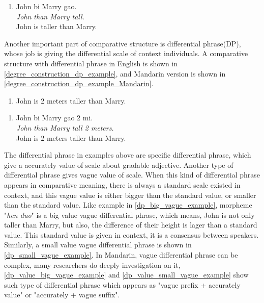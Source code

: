 \documentclass{ctexart}
\let \cite \parencite
\begin{document}
\begin{enumerate}[resume]
    \item \label{degree_construction_example_Mandarin}
    John bi Marry gao.  \\
    \textit{John than Marry tall.} \\
    John is taller than Marry.
\end{enumerate}

Another important part of comparative structure is differential phrase(DP), whose job is giving the differential scale of context individuals. A comparative structure with differential phrase in English is shown in \ref{degree_construction_dp_example}, and Mandarin version is shown in \ref{degree_construction_dp_example_Mandarin}.

\begin{enumerate}
    \item \label{degree_construction_dp_example}
    John is 2 meters taller than Marry.
\end{enumerate}

\begin{enumerate}[resume]
    \item \label{degree_construction_dp_example_Mandarin}
    John bi Marry gao 2 mi.  \\
    \textit{John than Marry tall 2 meters.} \\
    John is 2 meters taller than Marry.
\end{enumerate}

The differential phrase in examples above are specific differential phrase, which give a accurately value of scale about gradable adjective. Another type of differential phrase gives vague value of scale. When this kind of differential phrase appears in comparative meaning, there is always a standard scale existed in context, and this vague value is either bigger than the standard value, or smaller than the standard value. Like example in \ref{dp_big_vague_example}, morpheme "\textit{hen duo}" is a big value vague differential phrase, which means, John is not only taller than Marry, but also, the difference of their height is lager than a standard value. This standard value is given in context, it is a consensus between speakers. Similarly, a small value vague differential phrase is shown in \ref{dp_small_vague_example}. In Mandarin, vague differential phrase can be complex, many researchers \cite{lin2014,li2015} do deeply investigation on it, \ref{dp_value_big_vague_example} and \ref{dp_value_small_vague_example} show such type of differential phrase which appears as "vague prefix + accurately value" or "accurately + vague suffix".
\end{document}

